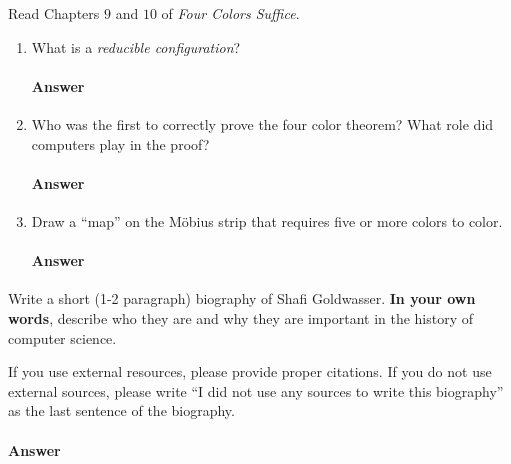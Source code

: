 \documentclass{article}
\begin{document}
\collab{\todo{}} 

Read Chapters $9$ and $10$ of \emph{Four Colors Suffice}.

\begin{enumerate}

    \item What is a \emph{reducible configuration}?

        \paragraph{Answer}




    \item Who was the first to correctly prove the four color theorem?  What
        role did computers play in the proof?

        \paragraph{Answer}





    \item Draw a ``map'' on the M\"obius strip that requires five or more colors
        to color.

        \paragraph{Answer}



\end{enumerate}

\collab{\todo{}}

Write a short (1-2 paragraph) biography of Shafi Goldwasser.
\textbf{In your own words}, describe who they are and why they are important in
the history of computer science.

If you use external resources, please provide
proper citations. If you do not use external sources, please write ``I did not
use any sources to write this biography'' as the last sentence of the
biography.

\paragraph{Answer}


% 
% 
\end{document}
